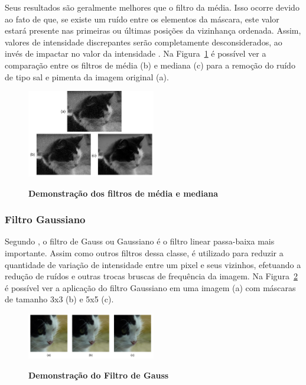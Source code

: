 \documentclass[12pt,oneside,a4paper,english,french,spanish,brazil,]{abntex2}
\begin{document}
Seus resultados são geralmente melhores que o filtro da média. Isso ocorre devido ao fato de que, se existe um ruído entre os elementos da máscara, este valor estará presente nas primeiras ou últimas posições da vizinhança ordenada. Assim, valores de intensidade discrepantes serão completamente desconsiderados, ao invés de impactar no valor da intensidade \cite{conci:2003}. Na Figura~\ref{fig:PDI_Media_Mediana} é possível ver a comparação entre os filtros de média (b) e mediana (c) para a remoção do ruído de tipo sal e pimenta da imagem original (a).

\begin{figure}[ht]
\centering
\caption{\textbf{ Demonstração dos filtros de média e mediana}}
\includegraphics[width=0.5\textwidth]{imagens/PDI_Media_Mediana.pdf}
\sourceAuthor
\label{fig:PDI_Media_Mediana}
\end{figure}

\subsubsection{Filtro Gaussiano}

Segundo \citet{conci:2003}, o filtro de Gauss ou Gaussiano é o filtro linear passa-baixa mais importante. Assim como outros filtros dessa classe, é utilizado para reduzir a quantidade de variação de intensidade entre um pixel e seus vizinhos, efetuando a redução de ruídos e outras trocas bruscas de frequência da imagem. Na Figura~\ref{fig:PDI_Gauss} é possível ver a aplicação do filtro Gaussiano em uma imagem (a) com máscaras de tamanho 3x3 (b) e 5x5 (c).

\begin{figure}[ht]
\centering
\caption{\textbf{Demonstração do Filtro de Gauss}}
\includegraphics[width=0.5\textwidth]{imagens/PDI_Gauss.pdf}
\sourceAuthor
\label{fig:PDI_Gauss}
\end{figure}
\end{document}
